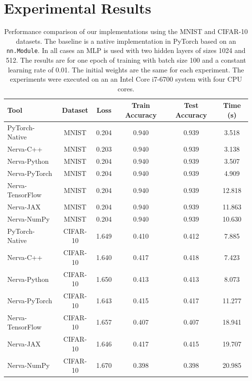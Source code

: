 \documentclass[twoside,11pt]{article}
\begin{document}
\section{Experimental Results} 
\label{section:experimental-results}
\begin{table}[tbh]
\centering
\caption{Performance comparison of our implementations using the MNIST and CIFAR-10
datasets. The baseline is a native implementation in PyTorch based on an \texttt{nn.Module}. 
In all cases an MLP is used with two hidden layers of sizes 1024 and 512. The results are for one epoch of training with batch size 100 and a constant learning rate of 0.01. The initial weights are the same for each experiment.
The experiments were executed on an an Intel Core i7-6700 system with four CPU cores.
}
\label{table:experiments}
\begin{tabular}{lccccc}
\toprule
Tool & Dataset & Loss & Train Accuracy & Test Accuracy & Time (s) \\
\midrule
PyTorch-Native & MNIST & 0.204 & 0.940 & 0.939 & 3.518 \\
\midrule
Nerva-C++ & MNIST & 0.203 & 0.940 & 0.939 & 3.138 \\
Nerva-Python & MNIST & 0.204 & 0.940 & 0.939 & 3.507 \\
Nerva-PyTorch & MNIST & 0.204 & 0.940 & 0.939 & 4.909 \\
Nerva-TensorFlow & MNIST & 0.204 & 0.940 & 0.939 & 12.818 \\
Nerva-JAX & MNIST & 0.204 & 0.940 & 0.939 & 11.863 \\
Nerva-NumPy & MNIST & 0.204 & 0.940 & 0.939 & 10.630 \\
\midrule
PyTorch-Native & CIFAR-10 & 1.649 & 0.410 & 0.412 & 7.885 \\
\midrule
Nerva-C++ & CIFAR-10 & 1.640 & 0.417 & 0.418 & 7.423 \\
Nerva-Python & CIFAR-10 & 1.650 & 0.413 & 0.413 & 8.073 \\
Nerva-PyTorch & CIFAR-10 & 1.643 & 0.415 & 0.417 & 11.277 \\
Nerva-TensorFlow & CIFAR-10 & 1.657 & 0.407 & 0.407 & 18.941 \\
Nerva-JAX & CIFAR-10 & 1.646 & 0.417 & 0.415 & 19.707 \\
Nerva-NumPy & CIFAR-10 & 1.670 & 0.398 & 0.398 & 20.985 \\
\bottomrule
\end{tabular}
\end{table}
\end{document}
